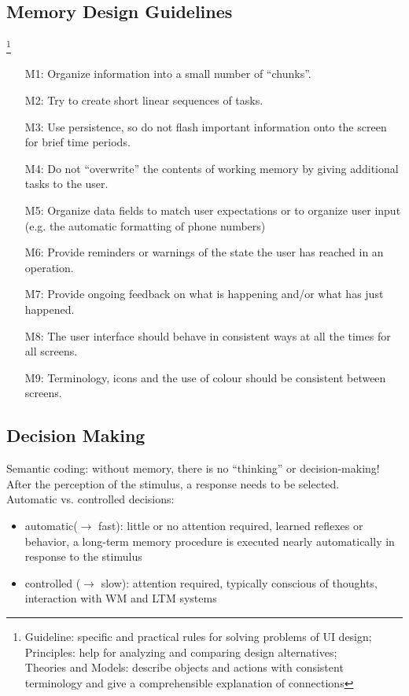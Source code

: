 \subsection{Memory Design Guidelines}\footnote{Guideline: specific and practical rules for solving problems of UI design;\\ Principles: help for analyzing and comparing design alternatives;\\
Theories and Models: describe objects and actions with consistent terminology and give a comprehensible explanation of connections}
\begin{itemize}
\item[M1:] Organize information into a small number of ``chunks''.
\item[M2:] Try to create short linear sequences of tasks.
\item[M3:] Use persistence, so do not flash important information onto the screen for brief time periods.
\item[M4:] Do not ``overwrite'' the contents of working memory by giving additional tasks to the user.
\item[M5:] Organize data fields to match user expectations or to organize user input (e.g. the automatic formatting of phone numbers)
\item[M6:] Provide reminders or warnings of the state the user has reached in an operation.
\item[M7:] Provide ongoing feedback on what is happening and/or what has just happened.
\item[M8:] The user interface should behave in consistent ways at all the times for all screens.
\item[M9:] Terminology, icons and the use of colour should be consistent between screens.
\end{itemize}

\subsection{Decision Making}
Semantic coding: without memory, there is no ``thinking'' or decision-making! After the perception of the stimulus, a response needs to be selected.\\
Automatic vs. controlled decisions:
\begin{itemize}
\item automatic($\rightarrow$ fast): little or no attention required, learned reflexes or behavior, a long-term memory procedure is executed nearly automatically in response to the stimulus
\item controlled ($\rightarrow$ slow): attention required, typically conscious of thoughts, interaction with WM and LTM systems
\end{itemize}
